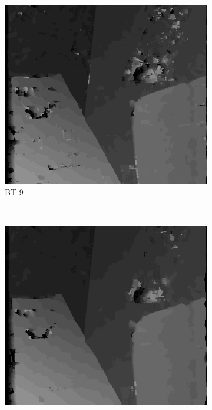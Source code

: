 \begin{figure}

  \begin{subfigure}[b]{0.23\textwidth}
    \centering
    \includegraphics[width=\textwidth]{images/stereo-pairs/venus_bt_9.png}
    \caption{BT 9}
  \end{subfigure}
  ~
  \begin{subfigure}[b]{0.23\textwidth}
    \centering
    \includegraphics[width=\textwidth]{images/stereo-pairs/venus_bt_13.png}

\end{subfigure}
\end{figure}
